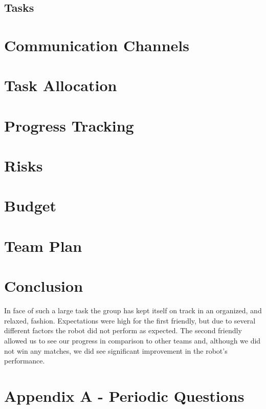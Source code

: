 \documentclass[a4paper,12pt]{article}
\begin{document}
\subsection{Tasks}


\section{Communication Channels}


\section{Task Allocation}


\section{Progress Tracking}


\section{Risks}

\section{Budget}

\section{Team Plan}


\section{Conclusion}
In face of such a large task the group has kept itself on track in an organized, and relaxed, fashion. Expectations were high for the first friendly, but due to several different factors the robot did not perform as expected. The second friendly allowed us to see our progress in comparison to other teams and, although we did not win any matches, we did see significant improvement in the robot's performance.

\newpage
\section*{Appendix A - Periodic Questions}
\begin{figure}[H]
    \centering
    
    \label{fig:andralog}
\end{figure}
\newpage
\end{document}
